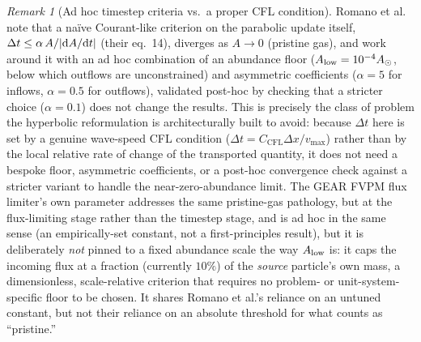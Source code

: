 \documentclass[11pt, a4paper, parskip]{scrartcl}
\newcommand{\code}[1]{\texttt{\seqsplit{#1}}}
\theoremstyle{plain}
\theoremstyle{definition}
\theoremstyle{remark}
\newtheorem{remark}{Remark}
\newcommand{\CCFL}{C_{\mathrm{CFL}}}                      %
\newcommand{\dx}{\Delta x}                                %
\newcommand{\dt}{\Delta t}                                %
\begin{document}
\begin{remark}[Ad hoc timestep criteria vs.\ a proper CFL condition]
Romano et al.~\citeyear{Romano2022} note that a na\"ive Courant-like criterion
on the parabolic update itself, $\dt\leq\alpha\,A/\lvert{\rm d}A/{\rm
d}t\rvert$ (their eq.~14), diverges as $A\to0$ (pristine gas), and work
around it with an ad hoc combination of an abundance floor
($A_{\rm low}=10^{-4}A_\odot$, below which outflows are unconstrained) and
asymmetric coefficients ($\alpha=5$ for inflows, $\alpha=0.5$ for
outflows), validated post-hoc by checking that a stricter choice
($\alpha=0.1$) does not change the results. This is precisely the class of
problem the hyperbolic reformulation is architecturally built to avoid:
because $\dt$ here is set by a genuine wave-speed CFL condition
($\dt=\CCFL\dx/v_{\max}$) rather than by the local relative rate of change
of the transported quantity, it does not need a bespoke floor, asymmetric
coefficients, or a post-hoc convergence check against a stricter variant
to handle the near-zero-abundance limit. The GEAR FVPM flux limiter's own
\code{startup\_fraction} parameter addresses the same pristine-gas
pathology, but at the flux-limiting stage rather than the timestep stage,
and is ad hoc in the same sense (an empirically-set constant, not a
first-principles result), but it is deliberately \emph{not} pinned to a
fixed abundance scale the way $A_{\rm low}$ is: it caps the incoming flux
at a fraction (currently $10\%$) of the \emph{source} particle's own mass,
a dimensionless, scale-relative criterion that requires no problem- or
unit-system-specific floor to be chosen. It shares Romano et al.'s
reliance on an untuned constant, but not their reliance on an absolute
threshold for what counts as ``pristine.''
\end{remark}
\end{document}
